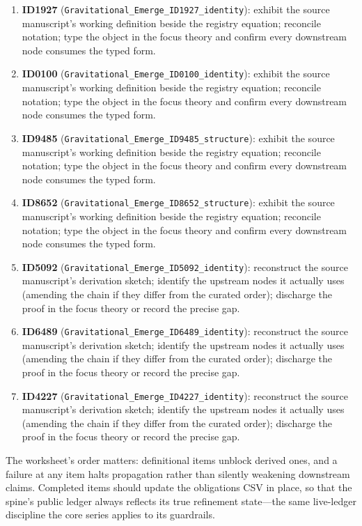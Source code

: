 \documentclass[11pt]{article}
\theoremstyle{remark}
\begin{document}
\begin{enumerate}
\item \textbf{ID1927} (\texttt{Gravitational\_Emerge\_ID1927\_identity}): exhibit the source manuscript's working definition beside the registry equation; reconcile notation; type the object in the focus theory and confirm every downstream node consumes the typed form.
\item \textbf{ID0100} (\texttt{Gravitational\_Emerge\_ID0100\_identity}): exhibit the source manuscript's working definition beside the registry equation; reconcile notation; type the object in the focus theory and confirm every downstream node consumes the typed form.
\item \textbf{ID9485} (\texttt{Gravitational\_Emerge\_ID9485\_structure}): exhibit the source manuscript's working definition beside the registry equation; reconcile notation; type the object in the focus theory and confirm every downstream node consumes the typed form.
\item \textbf{ID8652} (\texttt{Gravitational\_Emerge\_ID8652\_structure}): exhibit the source manuscript's working definition beside the registry equation; reconcile notation; type the object in the focus theory and confirm every downstream node consumes the typed form.
\item \textbf{ID5092} (\texttt{Gravitational\_Emerge\_ID5092\_identity}): reconstruct the source manuscript's derivation sketch; identify the upstream nodes it actually uses (amending the chain if they differ from the curated order); discharge the proof in the focus theory or record the precise gap.
\item \textbf{ID6489} (\texttt{Gravitational\_Emerge\_ID6489\_identity}): reconstruct the source manuscript's derivation sketch; identify the upstream nodes it actually uses (amending the chain if they differ from the curated order); discharge the proof in the focus theory or record the precise gap.
\item \textbf{ID4227} (\texttt{Gravitational\_Emerge\_ID4227\_identity}): reconstruct the source manuscript's derivation sketch; identify the upstream nodes it actually uses (amending the chain if they differ from the curated order); discharge the proof in the focus theory or record the precise gap.
\end{enumerate}

The worksheet's order matters: definitional items unblock derived ones, and a failure at any item halts propagation rather than silently weakening downstream claims. Completed items should update the obligations CSV in place, so that the spine's public ledger always reflects its true refinement state---the same live-ledger discipline the core series applies to its guardrails.
\end{document}
